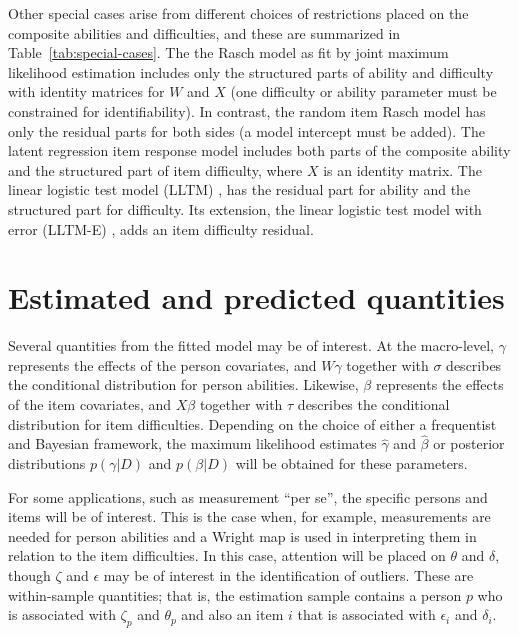 \documentclass[12pt, letterpaper]{article}
\begin{document}
Other special cases arise from different choices of restrictions placed on the composite abilities and difficulties, and these are summarized in Table~\ref{tab:special-cases}. The the Rasch model as fit by joint maximum likelihood estimation \parencite[for example,][]{embretson2000item} includes only the structured parts of ability and difficulty with identity matrices for $W$ and $X$ (one difficulty or ability parameter must be constrained for identifiability). In contrast, the random item Rasch model \parencite[for example,][]{DeBoeck2008} has only the residual parts for both sides (a model intercept must be added). The latent regression item response model \parencite{mislevy1985estimation, adams1997multilevel} includes both parts of the composite ability and the structured part of item difficulty, where $X$ is an identity matrix. The linear logistic test model (LLTM) \parencite{fischer1973linear}, has the residual part for ability and the structured part for difficulty. Its extension, the linear logistic test model with error (LLTM-E) \parencite[for example,][]{mislevy1988exploiting, Janssen2004}, adds an item difficulty residual.


\section{Estimated and predicted quantities}

Several quantities from the fitted model may be of interest. At the macro-level, $\gamma$ represents the effects of the person covariates, and $W \gamma$ together with $\sigma$ describes the conditional distribution for person abilities. Likewise, $\beta$ represents the effects of the item covariates, and $X \beta$ together with $\tau$ describes the conditional distribution for item difficulties. Depending on the choice of either a frequentist and Bayesian framework, the maximum likelihood estimates $\hat \gamma$ and $\hat \beta$ or posterior distributions $p(\gamma | D)$ and $p(\beta | D)$ will be obtained for these parameters.

For some applications, such as measurement ``per se'', the specific persons and items will be of interest. This is the case when, for example, measurements are needed for person abilities and a Wright map \parencite{wilson2004constructing} is used in interpreting them in relation to the item difficulties. In this case, attention will be placed on $\theta$ and $\delta$, though $\zeta$ and $\epsilon$ may be of interest in the identification of outliers. These are within-sample quantities; that is, the estimation sample contains a person $p$ who is associated with $\zeta_p$ and $\theta_p$ and also an item $i$ that is associated with $\epsilon_i$ and $\delta_i$.
\end{document}
